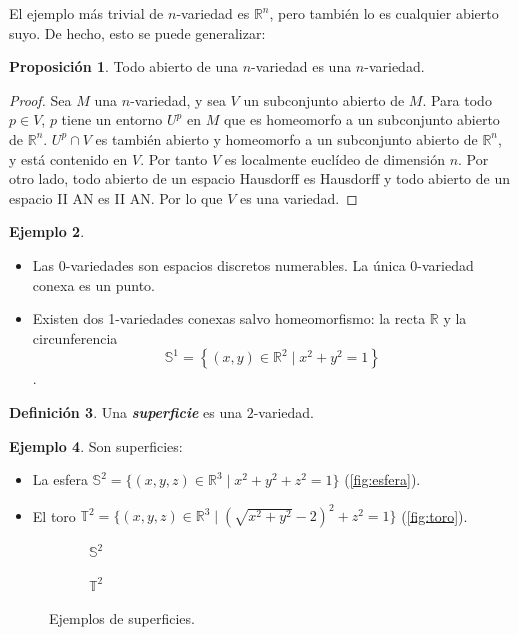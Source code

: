 \documentclass[10pt]{report}
\newcommand{\R}{\mathbb{R}}
\newcommand{\Esfera}{\mathbb{S}^2}
\newcommand{\Toro}{\mathbb{T}^2}
\theoremstyle{definition}
\newtheorem{defin}{Definición}[section]
\newtheorem{prop}[defin]{Proposición}
\newtheorem{eje}[defin]{Ejemplo}
\begin{document}
El ejemplo más trivial de $n$-variedad es $\R^n$, pero también lo es cualquier abierto suyo. De hecho, esto se puede generalizar:
\begin{prop}%
Todo abierto de una $n$-variedad es una $n$-variedad.
\end{prop}
\begin{proof}
Sea $M$ una $n$-variedad, y sea $V$ un subconjunto abierto de $M$. Para todo $p\in V$, $p$ tiene un entorno $U^p$ en $M$ que es homeomorfo a un subconjunto abierto de $\R^n$. $U^p\cap V$ es también abierto y homeomorfo a un subconjunto abierto de $\R^n$, y está contenido en $V$. Por tanto $V$ es localmente euclídeo de dimensión $n$. Por otro lado, todo abierto de un espacio Hausdorff es Hausdorff y todo abierto de un espacio II AN es II AN. Por lo que $V$ es una variedad.
\end{proof}
\begin{eje}%
\begin{itemize}
\item Las 0-variedades son espacios discretos numerables. La única 0-variedad conexa es un punto.
\item Existen dos 1-variedades conexas salvo homeomorfismo: la recta $\R$ y la circunferencia $$\mathbb{S}^1
=\left\{(x,y)\in \R^2\mid x^2+y^2=1\right\}$$.
\end{itemize}
\end{eje}
\begin{defin}%
Una \textbf{\emph{superficie}} es una $2$-variedad.
\end{defin}
\begin{eje}%
Son superficies:
\begin{itemize}
\item La esfera $\mathbb{S}^2=\{(x,y,z) \in \R^3\mid  x^2+y^2+z^2=1\}$ (\autoref{fig:esfera}).
\item El toro $\mathbb{T}^2=\{(x,y,z)\in \R^3\mid  (\sqrt{x^2+y^2}-2)^2+z^2=1\}$ (\autoref{fig:toro}).
\end{itemize}
\end{eje}
\begin{figure}%
\begin{subfigure}{.5\textwidth}
\centering
{}
\caption{$\Esfera$\label{fig:esfera}}
\end{subfigure}
\begin{subfigure}{.5\textwidth}
\centering
{}
\caption{$\Toro\label{fig:toro}$}
\end{subfigure}	
\caption{Ejemplos de superficies.}
\end{figure}
\end{document}
